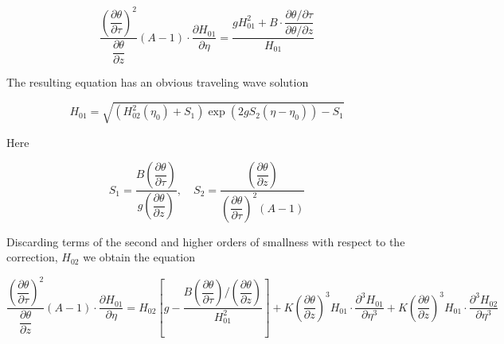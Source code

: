 \begin{equation}
\frac{\left( \dfrac{\partial \theta}{\partial \tau} \right)^2}{\dfrac{\partial \theta}{\partial z}} (A - 1) \cdot \frac{\partial H_{01}}{\partial \eta}
= \frac{g H_{01}^2 + B \cdot \dfrac{\partial \theta / \partial \tau}{\partial \theta / \partial z}}{H_{01}}
\end{equation}

The resulting equation has an obvious traveling wave solution

\begin{equation}
H_{01} = \sqrt{
\left( H_{02}^2(\eta_0) + S_1 \right)
\exp\left( 2g S_2 (\eta - \eta_0) \right)
- S_1
}
\end{equation}

Here

\begin{equation}
S_1 = \frac{B \left( \dfrac{\partial \theta}{\partial \tau} \right)}{g \left( \dfrac{\partial \theta}{\partial z} \right)}, \quad
S_2 = \frac{\left( \dfrac{\partial \theta}{\partial z} \right)}{\left( \dfrac{\partial \theta}{\partial \tau} \right)^2 (A - 1)}
\end{equation}

Discarding terms of the second and higher orders of smallness with
respect to the correction, $H_{02}$ we obtain the equation

\begin{equation}
\frac{\left( \dfrac{\partial \theta}{\partial \tau} \right)^2}{\dfrac{\partial \theta}{\partial z}} (A - 1) \cdot \frac{\partial H_{01}}{\partial \eta}
= H_{02} \left[ g - \frac{B \left( \dfrac{\partial \theta}{\partial \tau} \right) / \left( \dfrac{\partial \theta}{\partial z} \right)}{H_{01}^2} \right]
+ K \left( \frac{\partial \theta}{\partial z} \right)^3 H_{01} \cdot \frac{\partial^3 H_{01}}{\partial \eta^3}
+ K \left( \frac{\partial \theta}{\partial z} \right)^3 H_{01} \cdot \frac{\partial^3 H_{02}}{\partial \eta^3}
\end{equation}

